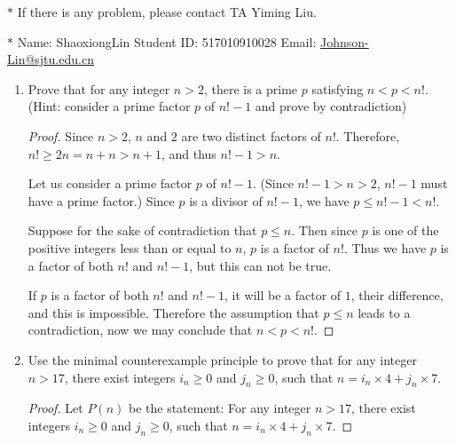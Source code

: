 \documentclass[12pt,a4paper]{article}
\theoremstyle{definition}
\begin{document}
\noindent

\noindent{}
\begin{center}
\footnotesize{\color{red}$*$ If there is any problem, please contact TA Yiming Liu.}

\footnotesize{\color{blue}$*$ Name: ShaoxiongLin  \quad Student ID: 517010910028 \quad Email: \href{mailto:Johnson-Lin@sjtu.edu.cn}{Johnson-Lin@sjtu.edu.cn}}
\end{center}

\begin{enumerate}
    \item
    Prove that for any integer $n>2$, there is a prime $p$ satisfying $n<p<n!$. {\color{blue}(Hint: consider a prime factor $p$ of $n!-1$ and prove by contradiction)}
    \begin{proof}
        Since $n > 2$, $n$ and $2$ are two distinct factors of $n!$. Therefore, $n! \geq 2n = n + n > n + 1$, and thus $n! -1 > n$. 
        
        Let us consider a prime factor $p$ of $n!-1$. (Since $n! -1 > n > 2$, $n!-1$ must have a prime factor.) Since $p$ is a divisor of $n! - 1$, we have 
        $p \leq n! - 1 < n!$. 
        
        Suppose for the sake of contradiction that $p \leq n$. Then since $p$ is one of the positive integers less than or equal to $n$, $p$ is a factor of $n!$. Thus we have $p$ is a factor of both $n!$ and $n! -1$, but this can not be true.
        
        If $p$ is a factor of both $n!$ and $n! -1$, it will be a factor of $1$, their difference, and this is impossible. Therefore the assumption that $ p \leq n$ leads to a contradiction, now we may conclude that $n < p < n!$.
    \end{proof}

    \item
    Use the minimal counterexample principle to prove that for any integer $n>17$, there exist integers $i_n\ge 0$ and $j_n\ge 0$, such that $n = i_n \times 4 + j_n \times 7$.
    \begin{proof}
        Let $P(n)$ be the statement: For any integer $n>17$, there exist integers $i_n\ge 0$ and $j_n\ge 0$, such that $n = i_n \times 4 + j_n \times 7$.
        

\end{proof}
\end{enumerate}
\end{document}

